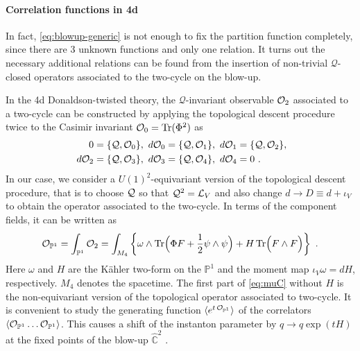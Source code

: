 \documentclass[letterpaper, 11pt]{article}
\def\IC{\mathbb{C}}
\def\IP{\mathbb{P}}
\def\CL{{\cal L}}
\def\CO{{\cal O}}
\def\CQ{{\cal Q}}
\def\half{\frac{1}{2}}
\begin{document}
\paragraph{Correlation functions in 4d}

In fact, \eqref{eq:blowup-generic} is not enough to fix the partition function completely,  since there are 3 unknown functions and only one relation. It turns out the necessary additional relations can be found from the insertion of non-trivial $\mathcal{Q}$-closed operators \cite{Nakajima:2003pg,Nakajima:2005fg} associated to the two-cycle on the blow-up. 

In the 4d Donaldson-twisted theory, the $\mathcal{Q}$-invariant observable $\CO_2$ associated to a two-cycle can be constructed by applying the topological descent procedure twice to the Casimir invariant $\CO_0 = \text{Tr}(\Phi^2)$ as \cite{Witten:1988ze}
\begin{align}
\begin{split}
0 &= \{ \CQ, \CO_0 \}, 
~ d\CO_0 = \{\CQ, \CO_1 \}, 
~ d\CO_1 = \{\CQ, \CO_2 \}, \\
~ d\CO_2 &= \{\CQ, \CO_3 \}, 
~ d\CO_3 = \{\CQ, \CO_4 \}, 
~ d\CO_4 = 0 \ . 
\end{split}
\end{align} 
In our case, we consider a $U(1)^2$-equivariant version of the topological descent procedure, that is to choose $\CQ$ so that $\CQ^2 = \CL_V$ and also change $d \to D \equiv d + \iota_V$ to obtain the operator associated to the two-cycle. In terms of the component fields, it can be written as \cite{Bershtein:2015xfa}
\begin{align} \label{eq:muC}
  {\CO}_{\IP^1} = \int_{\IP^1} \CO_2 = \int_{M_4} \left\{ \omega \wedge \text{Tr}\Big(\Phi F + \half \psi \wedge \psi\Big) + H\, \text{Tr}\Big( F \wedge F \Big) \right\}  \ .
\end{align} 
Here $\omega$ and $H$ are the K\"ahler two-form on the $\IP^1$ and the moment map $\iota_V \omega = dH$, respectively. $M_4$ denotes the spacetime. The first part of \eqref{eq:muC} without $H$ is the non-equivariant version of the topological operator associated to two-cycle. 
It is convenient to study the generating function $\langle e^{t \, {\CO}_{\IP^1}}\rangle $ of the correlators $\langle {\CO}_{\IP^1} \ldots {\CO}_{\IP^1} \rangle$. 
This causes a shift of the instanton parameter by $q \to q \exp(t H)$ at the fixed points of the blow-up $\hat{\IC}^2$ \cite{Nakajima:2003pg,Nakajima:2003uh, Nakajima:2005fg}.  
\end{document}
